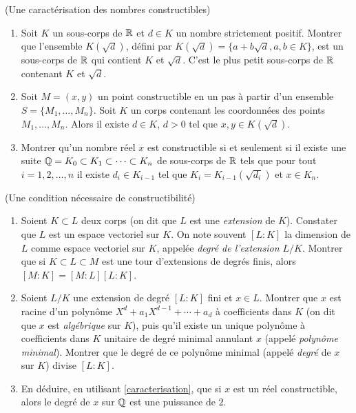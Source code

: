 \documentclass[a4paper,11pt,reqno]{amsart}
\begin{document}
\begin{exo} \label{caracterisation} (Une caractérisation des nombres constructibles)

  \begin{enumerate}
    \item Soit $K$ un sous-corps de $\mathbb{R}$ et $d \in K$ un nombre strictement positif. Montrer que l'ensemble $K(\sqrt{d})$, défini par $K(\sqrt{d})=\{a+b\sqrt{d}, a, b \in K\}$, est un sous-corps de $\mathbb{R}$ qui contient $K$ et $\sqrt{d}$. C'est le plus petit sous-corps de $\mathbb{R}$ contenant $K$ et $\sqrt{d}$.
    \item Soit $M=(x,y)$ un point constructible en un pas à partir d'un ensemble $S=\{M_1,\ldots,M_n\}$. Soit $K$ un corps contenant les coordonnées des points $M_1,\ldots,M_n$. Alors il existe $d \in K$, $d>0$ tel que $x,y \in K(\sqrt{d})$.
    \item Montrer qu'un nombre réel $x$ est constructible si et seulement si il existe une suite $\mathbb{Q}=K_0 \subset K_1 \subset \cdots \subset K_n$ de sous-corps de $\mathbb{R}$ tels que pour tout $i=1,2,\ldots,n$ il existe $d_i \in K_{i-1}$ tel que $K_i=K_{i-1}(\sqrt{d_i})$ et $x \in K_n$.
  \end{enumerate}
\end{exo}


\begin{exo}  (Une condition nécessaire de constructibilité)
  \begin{enumerate}
    \item Soient $K \subset L$ deux corps (on dit que $L$ est une \emph{extension} de $K$). Constater que $L$ est un espace vectoriel sur $K$. On note souvent $[L:K]$ la dimension de $L$ comme espace vectoriel sur $K$, appelée \emph{degré de l'extension $L/K$}. Montrer que si $K \subset L \subset M$ est une tour d'extensions de degrés finis, alors $[M:K]=[M:L][L:K]$.
    \item Soient $L/K$ une extension de degré $[L:K]$ fini et $x \in L$. Montrer que $x$ est racine d'un polynôme $X^d+a_1 X^{d-1} + \cdots + a_d$ à coefficients dans $K$ (on dit que $x$ est \emph{algébrique} sur $K$), puis qu'il existe un unique polynôme à coefficients dans $K$ unitaire de degré minimal annulant $x$ (appelé \textit{polynôme minimal}). Montrer que le degré de ce polynôme minimal (appelé \emph{degré} de $x$ sur $K$) divise $[L:K]$.
    \item En déduire, en utilisant \ref{caracterisation}, que si $x$ est un réel constructible, alors le degré de $x$ sur $\mathbb{Q}$ est une puissance de $2$.
  \end{enumerate}
\end{exo}
\end{document}
